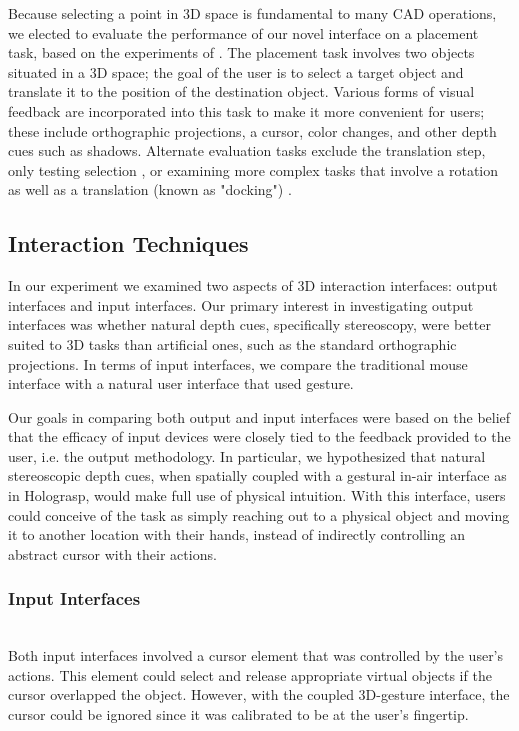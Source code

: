 \documentclass[pageno]{jpaper}
\begin{document}
Because selecting a point in 3D space is fundamental to many CAD operations, we elected to
evaluate the performance of our novel interface on a placement task, based on the experiments
of \cite{study1, study2}. The placement task involves two objects situated in a 3D space; the
goal of the user is to select a target object and translate it to the position of the
destination object. Various forms of visual feedback are incorporated into this task to
make it more convenient for users; these include orthographic projections, a cursor, color
changes, and other depth cues such as shadows. Alternate evaluation tasks exclude the
translation step, only testing selection \cite{holodesk}, or examining more complex tasks
that involve a rotation as well as a translation (known as "docking") \cite{masliah2000measuring}.

\subsection{Interaction Techniques}
In our experiment we examined two aspects of 3D interaction interfaces: output interfaces and
input interfaces. Our primary interest in investigating output interfaces was whether natural depth cues,
specifically stereoscopy, were better suited to 3D tasks than artificial ones, such as the
standard orthographic projections. In terms of input interfaces, we compare the traditional
mouse interface with a natural user interface that used gesture.

Our goals in comparing both output and input interfaces were based on the belief that the
efficacy of input devices were closely tied to the feedback provided to the user, i.e. the
output methodology. In particular, we hypothesized that natural stereoscopic
depth cues, when spatially coupled with a gestural in-air interface as in Holograsp, would make full use of
physical intuition. With this interface, users could conceive of the task as simply reaching
out to a physical object and moving it to another location with their hands, instead of
indirectly controlling an abstract cursor with their actions.

\subsubsection{Input Interfaces}$ $\\
Both input interfaces involved a cursor element that was controlled by the user's actions. This
element could select and release appropriate virtual objects if the cursor overlapped the object.
However, with the coupled 3D-gesture interface, the cursor could be ignored since it was
calibrated to be at the user's fingertip.
\end{document}
